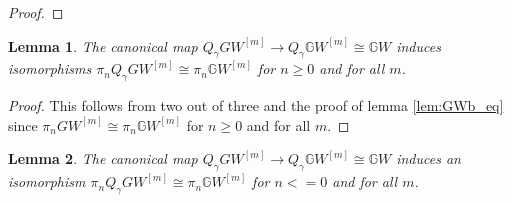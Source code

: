 \documentclass[draftthesis,tocnosub,noragright,centerchapter,10pt]{uiucthesis2009}
\newcommand{\mbb}{\mathbb}
\theoremstyle{plain}
\newtheorem{lemma}{Lemma}
\theoremstyle{definition}
\begin{document}
\begin{proof}

\end{proof}



\begin{lemma}\label{lem:pos_htpy}
The canonical map $Q_\gamma GW^{[m]} \rightarrow Q_\gamma \mbb GW^{[m]} \cong \mbb
GW$ induces isomorphisms $\pi_nQ_\gamma GW^{[m]} \cong \pi_n \mbb
GW^{[m]}$ for $n \geq 0$ and for all $m$.
\end{lemma}

\begin{proof}
This follows from two out of three and the proof of lemma \ref{lem:GWb_eq} since $\pi_nGW^{[m]} \cong \pi_n \mbb GW^{[m]}$
for $n \geq 0$ and for all $m$. 
\end{proof}


\begin{lemma}
The canonical map $Q_\gamma GW^{[m]} \rightarrow Q_\gamma \mbb GW^{[m]} \cong \mbb
GW$ induces an isomorphism $\pi_n Q_\gamma GW^{[m]} \cong \pi_n \mbb
GW^{[m]}$ for $n <= 0$ and for all $m$.
\end{lemma}
\end{document}
